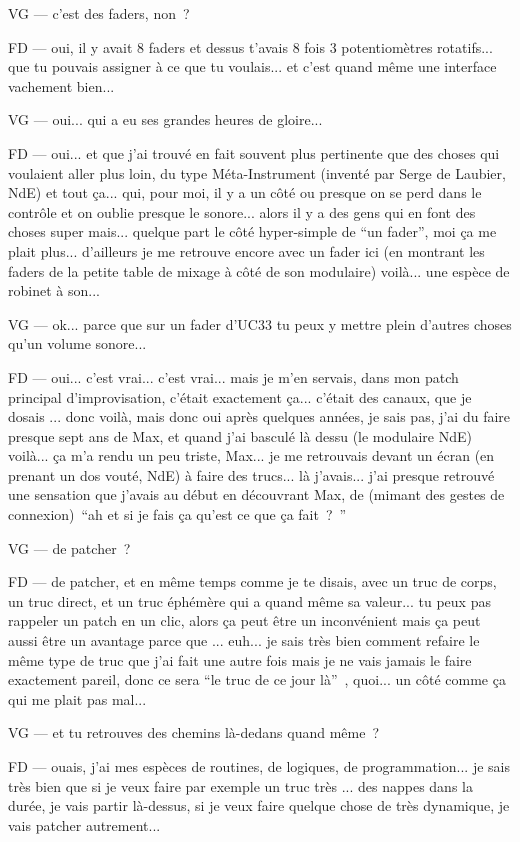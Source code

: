 VG — c'est des faders, non ? 

FD — oui, il y avait 8 faders et dessus t'avais 8 fois 3 potentiomètres rotatifs... que tu pouvais assigner à ce que tu voulais... et c'est quand même une interface vachement bien... 

VG — oui... qui a eu ses grandes heures de gloire... 

FD — oui... et que j'ai trouvé en fait souvent plus pertinente que des choses qui voulaient aller plus loin, du type Méta-Instrument (inventé par Serge de Laubier, NdE) et tout ça... qui, pour moi, il y a un côté ou presque on se perd dans le contrôle et on oublie presque le sonore... alors il y a des gens qui en font des choses super mais... quelque part le côté hyper-simple de ``un fader'', moi ça me plait plus... d'ailleurs je me retrouve encore avec un fader ici (en montrant les faders de la petite table de mixage à côté de son modulaire) voilà... une espèce de robinet à son... 

VG — ok... parce que sur un fader d'UC33 tu peux y mettre plein d'autres choses qu'un volume sonore... 

FD — oui... c'est vrai... c'est vrai... mais je m'en servais, dans mon patch principal d'improvisation, c'était exactement ça... c'était des canaux, que je dosais ... donc voilà, mais donc oui après quelques années, je sais pas, j'ai du faire presque sept ans de Max, et quand j'ai basculé là dessu (le modulaire NdE) voilà... ça m'a rendu un peu triste, Max... je me retrouvais devant un écran (en prenant un dos vouté, NdE) à faire des trucs... là j'avais... j'ai presque retrouvé une sensation que j'avais au début en découvrant Max, de (mimant des gestes de connexion) ``ah et si je fais ça qu'est ce que ça fait ? '' 

VG — de patcher ? 

FD — de patcher, et en même temps comme je te disais, avec un truc de corps, un truc direct, et un truc éphémère qui a quand même sa valeur... tu peux pas rappeler un patch en un clic, alors ça peut être un inconvénient mais ça peut aussi être un avantage parce que ... euh... je sais très bien comment refaire le même type de truc que j'ai fait une autre fois mais je ne vais jamais le faire exactement pareil, donc ce sera ``le truc de ce jour là'' , quoi... un côté comme ça qui me plait pas mal... 

VG — et tu retrouves des chemins là-dedans quand même ? 

FD — ouais, j'ai mes espèces de routines, de logiques, de programmation... je sais très bien que si je veux faire par exemple un truc très ... des nappes dans la durée, je vais partir là-dessus, si je veux faire quelque chose de très dynamique, je vais patcher autrement... 

